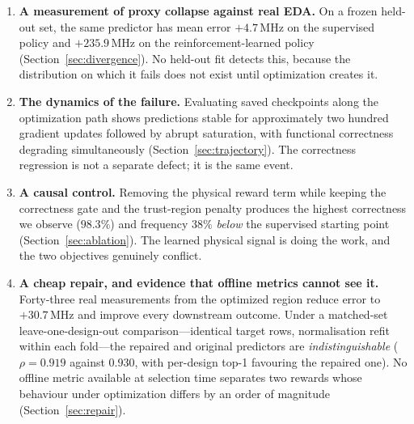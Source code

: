 \documentclass[journal]{IEEEtran}
\begin{document}
\begin{enumerate}
\item \textbf{A measurement of proxy collapse against real EDA.} On a frozen
held-out set, the same predictor has mean error $+4.7$\,MHz on the supervised
policy and $+235.9$\,MHz on the reinforcement-learned policy
(Section~\ref{sec:divergence}). No held-out fit detects this, because the
distribution on which it fails does not exist until optimization creates it.

\item \textbf{The dynamics of the failure.} Evaluating saved checkpoints along
the optimization path shows predictions stable for approximately two hundred
gradient updates followed by abrupt saturation, with functional correctness
degrading simultaneously (Section~\ref{sec:trajectory}). The correctness
regression is not a separate defect; it is the same event.

\item \textbf{A causal control.} Removing the physical reward term while keeping
the correctness gate and the trust-region penalty produces the highest
correctness we observe ($98.3\%$) and frequency $38\%$ \emph{below} the
supervised starting point (Section~\ref{sec:ablation}). The learned physical
signal is doing the work, and the two objectives genuinely conflict.

\item \textbf{A cheap repair, and evidence that offline metrics cannot see it.}
Forty-three real measurements from the optimized region reduce error to
$+30.7$\,MHz and improve every downstream outcome. Under a matched-set
leave-one-design-out comparison---identical target rows, normalisation refit
within each fold---the repaired and original predictors are
\emph{indistinguishable} ($\rho = 0.919$ against $0.930$, with per-design top-1
favouring the repaired one). No offline metric available at selection time
separates two rewards whose behaviour under optimization differs by an order of
magnitude (Section~\ref{sec:repair}).
\end{enumerate}

\end{document}
